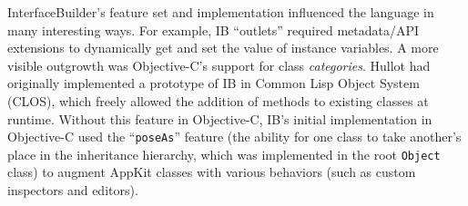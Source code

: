 \documentclass[acmsmall]{acmart}\settopmatter{}
\begin{document}
InterfaceBuilder's feature set and implementation influenced the language in many interesting ways. For example, IB ``outlets'' required metadata/API extensions to dynamically get and set the value of instance variables. A more visible outgrowth was Objective-C's support for class \emph{categories}. Hullot had originally implemented a prototype of IB in Common Lisp Object System (CLOS), which freely allowed the addition of methods to existing classes at runtime. Without this feature in Objective-C, IB's initial implementation in Objective-C used the ``\verb$poseAs$'' feature (the ability for one class to take another's place in the inheritance hierarchy, which was implemented in the root \verb$Object$ class) to augment AppKit classes with various behaviors (such as custom inspectors and editors).

\addtocounter{appendix_spec.runtime_pagenum}{8}
\addtocounter{appendix_spec.language_pagenum}{5}
\addtocounter{appendix_spec.runtime_pagenum_range_start}{3}
\addtocounter{appendix_spec.runtime_pagenum_range_end}{8}
\end{document}
